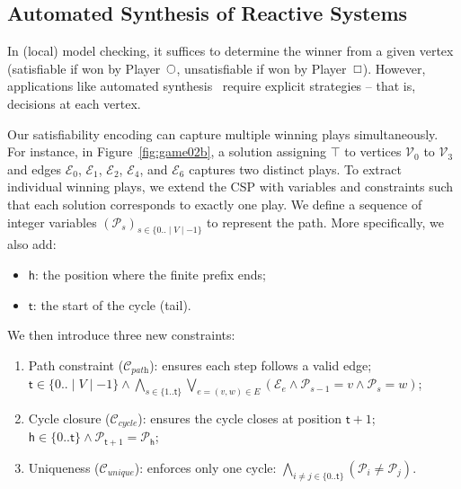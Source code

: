 \documentclass[letterpaper]{article} %
\begin{document}
\subsection{Automated Synthesis of Reactive Systems}

In (local) model checking, it suffices to determine the winner from a given vertex (satisfiable if won by Player~$\even$, unsatisfiable if won by Player~$\odd$). However, applications like automated synthesis~\cite{Bruyere:2022,Finkbeiner:2018,Luttenberger:2020} require explicit strategies -- that is, decisions at each vertex.

Our satisfiability encoding can capture multiple winning plays simultaneously. For instance, in Figure~\ref{fig:game02b}, a solution assigning $\top$ to vertices $\mathcal{V}_0$ to $\mathcal{V}_3$ and edges $\mathcal{E}_0$, $\mathcal{E}_1$, $\mathcal{E}_2$, $\mathcal{E}_4$, and $\mathcal{E}_6$ captures two distinct plays.
%
To extract individual winning plays, we extend the CSP with variables and constraints such that each solution corresponds to exactly one play. We define a sequence of integer variables $(\mathcal{P}_s)_{s \in \{0..\mid V \mid - 1\}}$ to represent the path. More specifically, we also add:
\begin{itemize}
\item $\mathsf{h}$: the position where the finite prefix ends;

\item $\mathsf{t}$: the start of the cycle (tail).
\end{itemize} 

\noindent 
We then introduce three new constraints:
\begin{enumerate}
\item Path constraint ($\mathcal{C}_{\textit{path}}$): ensures each step follows a valid edge;
$\mathsf{t} \in \{0..\mid V \mid -1\} \wedge \bigwedge_{s \in \{1..\mathsf{t}\}} \bigvee_{e=(v,w) \in E} (\mathcal{E}_e \wedge \mathcal{P}_{s-1} = v \wedge \mathcal{P}_s = w)$;

\item Cycle closure ($\mathcal{C}_{\textit{cycle}}$): ensures the cycle closes at position $\mathsf{t} + 1$;
$\mathsf{h} \in \{0..\mathsf{t}\} \wedge \mathcal{P}_{\mathsf{t}+1} = \mathcal{P}_\mathsf{h}$;

\item Uniqueness ($\mathcal{C}_{\textit{unique}}$): enforces only one cycle: $\bigwedge_{i \neq j \in \{0..\mathsf{t}\}} (\mathcal{P}_i \neq \mathcal{P}_j)$.
\end{enumerate} 
\end{document}
